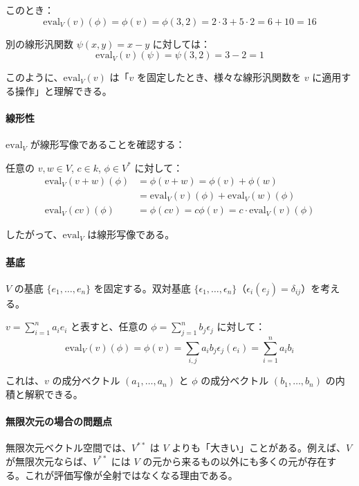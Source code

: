 \documentclass[uplatex,a4j,12pt,dvipdfmx]{jsarticle}
\begin{document}
このとき：
\[
	\mathrm{eval}_V(v)(\phi) = \phi(v) = \phi(3,2) = 2\cdot3 + 5\cdot2 = 6 + 10 = 16
\]

別の線形汎関数 $\psi(x,y) = x - y$ に対しては：
\[
	\mathrm{eval}_V(v)(\psi) = \psi(3,2) = 3 - 2 = 1
\]

このように、$\mathrm{eval}_V(v)$ は「$v$ を固定したとき、様々な線形汎関数を $v$ に適用する操作」と理解できる。

\paragraph{線形性}

$\mathrm{eval}_V$ が線形写像であることを確認する：

任意の $v, w \in V$, $c \in k$, $\phi \in V^*$ に対して：
\begin{align*}
	\mathrm{eval}_V(v + w)(\phi) & = \phi(v + w) = \phi(v) + \phi(w)                      \\
	                             & = \mathrm{eval}_V(v)(\phi) + \mathrm{eval}_V(w)(\phi)  \\
	\mathrm{eval}_V(cv)(\phi)    & = \phi(cv) = c\phi(v) = c\cdot\mathrm{eval}_V(v)(\phi)
\end{align*}

したがって、$\mathrm{eval}_V$ は線形写像である。

\paragraph{基底}

$V$ の基底 $\{e_1, \ldots, e_n\}$ を固定する。双対基底 $\{\epsilon_1, \ldots, \epsilon_n\}$（$\epsilon_i(e_j) = \delta_{ij}$）を考える。

$v = \sum_{i=1}^n a_i e_i$ と表すと、任意の $\phi = \sum_{j=1}^n b_j \epsilon_j$ に対して：
\[
	\mathrm{eval}_V(v)(\phi) = \phi(v) = \sum_{i,j} a_i b_j \epsilon_j(e_i) = \sum_{i=1}^n a_i b_i
\]

これは、$v$ の成分ベクトル $(a_1, \ldots, a_n)$ と $\phi$ の成分ベクトル $(b_1, \ldots, b_n)$ の内積と解釈できる。

\paragraph{無限次元の場合の問題点}

無限次元ベクトル空間では、$V^{**}$ は $V$ よりも「大きい」ことがある。例えば、$V$ が無限次元ならば、$V^{**}$ には $V$ の元から来るもの以外にも多くの元が存在する。これが評価写像が全射ではなくなる理由である。
\end{document}
